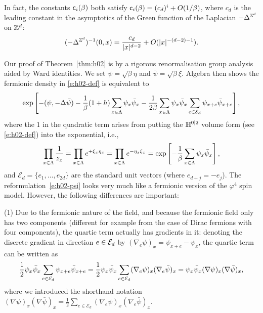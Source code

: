 \documentclass[11pt]{amsart}
\numberwithin{equation}{section}
\numberwithin{theorem}{section}
\newcommand{\1}{{\bf 1}}
\begin{document}
In fact, the constants ${\sf c}_{i}(\beta)$ both satisfy ${\sf
  c}_{i}(\beta) = (c_{d})^{i} + O(1/\beta)$, where $c_{d}$ is the
leading constant in the asymptotics of the Green function of the
Laplacian $-\Delta^{\mathbb{Z}^{d}}$ on $\mathbb{Z}^{d}$:
\begin{equation}
  \label{eq:LapZd}
  (-\Delta^{\mathbb{Z}^d})^{-1}(0,x)
  = \frac{c_{d}}{|x|^{d-2}} + O(|x|^{-(d-2)-1}).
\end{equation}

Our proof of Theorem~\ref{thm:h02} is by a rigorous renormalisation
group analysis aided by Ward identities.  We set
$\psi=\sqrt{\beta}\eta$ and $\bar\psi = \sqrt{\beta}\xi$. 
Algebra then shows the fermionic density in
\eqref{e:h02-def} is equivalent to
\begin{equation}
  \label{e:h02-psi}
  \exp\left[{- (\psi,-\Delta\bar\psi)
    -\frac{1}{\beta}(1+h)  \sum_{x\in\Lambda}\psi_x\bar\psi_x - \frac{1}{2\beta} \sum_{x\in\Lambda} \psi_x\bar\psi_x \sum_{e\in \mathcal{E}_d} \psi_{x+e} \bar\psi_{x+e}
  }\right],
\end{equation}
where the $1$ in the quadratic term arises from putting the ${\mathbb H}^{0|2}$ volume form (see   \eqref{e:h02-def})
into the exponential, i.e.,
\begin{equation}
   \prod_{x\in\Lambda}\frac{1}{z_x} = \prod_{x\in\Lambda} e^{+\xi_x\eta_x}=\prod_{x\in\Lambda}e^{-\eta_x\xi_x} = \exp\left[{-\frac{1}{\beta}\sum_{x\in\Lambda}\psi_x\bar\psi_x}\right],
\end{equation}
and $\mathcal{E}_{d}=\{e_{1},\dots, e_{2d}\}$ are the standard unit
vectors (where $e_{d+j}=-e_{j}$). The reformulation~\eqref{e:h02-psi} looks
very much like a fermionic version of the $\varphi^4$ spin
model. However, the following differences are important:

(1) Due to the fermionic nature of the field, and because the
  fermionic field only has two components (different for example from
  the case of Dirac fermions with four components), the quartic term
actually has gradients in it: denoting the discrete gradient in
direction $e \in \mathcal E_d$ by
$(\nabla_e\psi)_x = \psi_{x+e}-\psi_x$, the quartic term can be
written as
\begin{equation}
  \label{e:quartic}
  \frac12
  \psi_x\bar\psi_x \sum_{e\in \mathcal{E}_d} \psi_{x+e}\bar\psi_{x+e}
  =
   \frac12
  \psi_x\bar\psi_x \sum_{e\in \mathcal{E}_d} (\nabla_e \psi)_x(\nabla_e \bar\psi)_x
  =
  \psi_x\bar\psi_x (\nabla \psi)_x(\nabla \bar\psi)_x,
\end{equation}
where we introduced the shorthand notation
$(\nabla \psi)_x(\nabla \bar\psi)_x= \frac12 \sum_{e\in \mathcal{E}_d}
(\nabla_e \psi)_x(\nabla_e \bar\psi)_x$.
\end{document}
